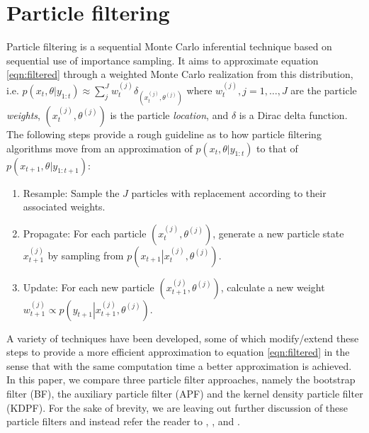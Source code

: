 \documentclass[useAMS,referee,usenatbib]{biom}
\begin{document}
\section{Particle filtering \label{sec:filtering}}

Particle filtering is a sequential Monte Carlo inferential technique based on sequential use of importance sampling. It aims to approximate equation \eqref{eqn:filtered} through a weighted Monte Carlo realization from this distribution, i.e. $p(x_t,\theta| y_{1:t}) \approx \sum_{j}^J w_t^{(j)} \delta_{(x_t^{(j)},\theta^{(j)})}$ where $w_t^{(j)},j=1,\ldots,J$ are the particle \emph{weights}, $(x_t^{(j)},\theta^{(j)})$ is the particle \emph{location}, and $\delta$ is a Dirac delta function. The following steps provide a rough guideline as to how particle filtering algorithms move from an approximation of $p(x_t,\theta| y_{1:t})$ to that of $p(x_{t+1},\theta| y_{1:t+1})$:

\begin{enumerate}
\item Resample: Sample the $J$ particles with replacement according to their associated weights.
\item Propagate: For each particle $(x_t^{(j)},\theta^{(j)})$, generate a new particle state $x_{t+1}^{(j)}$ by sampling from $p\left(\left. x_{t+1}\right|x_t^{(j)},\theta^{(j)}\right)$.
\item Update: For each new particle $(x_{t+1}^{(j)},\theta^{(j)})$, calculate a new weight $w_{t+1}^{(j)} \propto p\left(\left. y_{t+1}\right|x_{t+1}^{(j)},\theta^{(j)}\right)$.
\end{enumerate}

A variety of techniques have been developed, some of which modify/extend these steps to provide a more efficient approximation to equation \eqref{eqn:filtered} in the sense that with the same computation time a better approximation is achieved. In this paper, we compare three particle filter approaches, namely the bootstrap filter (BF), the auxiliary particle filter (APF) and the kernel density particle filter (KDPF).  For the sake of brevity, we are leaving out further discussion of these particle filters and instead refer the reader to \citet{Gord:Salm:Smit:nove:1993}, \citet{Pitt:Shep:filt:1999}, and \citet{Liu:West:comb:2001}.

\end{document}
